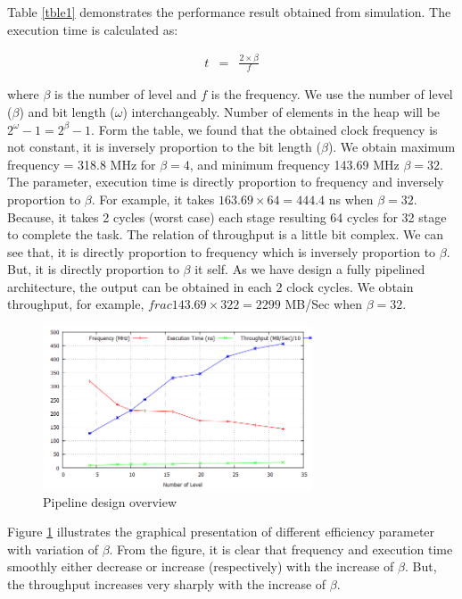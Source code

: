 \documentclass[10pt, conference, compsocconf]{IEEEtran}
\begin{document}
Table \ref{tble1} demonstrates the performance result obtained from simulation. The execution time is calculated as:

\begin{eqnarray}
t &=&  \frac{2 \times  \beta}{f}
\end{eqnarray}

where $\beta$ is the number of level and $f$ is the frequency. We use the number of level ($\beta$) and bit length ($\omega$) interchangeably. Number of elements in the heap will be $2^\omega-1 = 2^\beta -1$. Form the table, we found that the obtained clock frequency is not constant, it is inversely proportion to the bit length ($\beta$). We obtain maximum frequency = 318.8 MHz for $\beta = 4$, and minimum frequency 143.69 MHz $\beta = 32$. The parameter, execution time is directly proportion to frequency and inversely proportion to $\beta$. For example, it takes $163.69 \times 64 = 444.4$ ns when $\beta = 32$. Because, it takes 2 cycles (worst case) each stage resulting 64 cycles for 32 stage to complete the task. The relation of throughput is a little bit complex. We can see that, it is directly proportion to frequency which is inversely proportion to $\beta$. But, it is directly proportion to $\beta$ it self. As we have design a fully pipelined architecture, the output can be obtained in each 2 clock cycles. We obtain throughput, for example, $frac{143.69 \times 32 }{2} = 2299$ MB/Sec when $\beta = 32$.

\begin{figure}[h]
  \centering
  \includegraphics[width=8cm]{Figures/result1.png}
      \caption{Pipeline design overview}
    \label{result1}
\end{figure}

Figure \ref{result1} illustrates the graphical presentation of different efficiency parameter with variation of $\beta$. From the figure, it is clear that frequency and execution time smoothly either decrease or increase (respectively) with the increase of $\beta$. But, the throughput increases very sharply with the increase of $\beta$.
\end{document}
